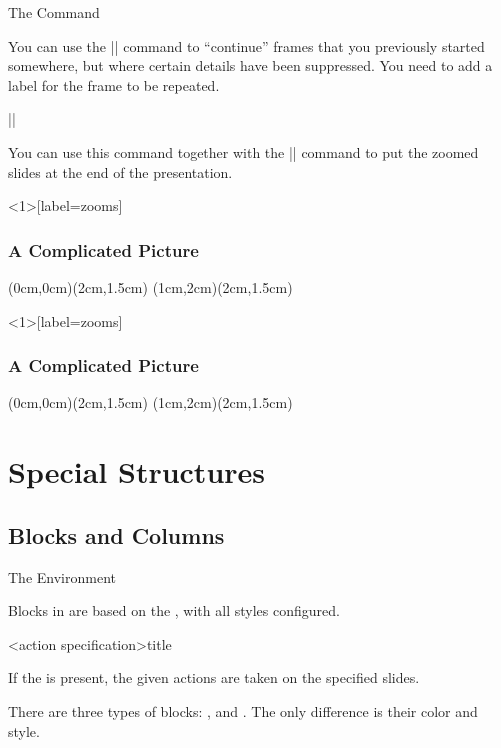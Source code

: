 \begin{fragileframe}{The  Command}
	
You can use the \LC|\againframe| command to ``continue'' frames that you previously started
somewhere, but where certain details have been suppressed. You need to add a label for the frame to be repeated.

\begin{command}
\LC||
\end{command}

You can use this command together with the \LC|\framezoom| command to put the zoomed slides at the end of the presentation.

\begin{example}
\begin{LCL}
\begin{frame}<1>[label=zooms]
\frametitle<1>{A Complicated Picture}
(0cm,0cm)(2cm,1.5cm)
(1cm,2cm)(2cm,1.5cm)
\end{frame}
\end{LCL}
\end{example}

\end{fragileframe}


\begin{frame}<1>[label=zooms]
\frametitle<1>{A Complicated Picture}
(0cm,0cm)(2cm,1.5cm)
(1cm,2cm)(2cm,1.5cm)
\end{frame}

\section{Special Structures}

\subsection{Blocks and Columns}

\begin{fragileframe}{The  Environment}

Blocks in  are based on the , with all styles configured.

\begin{command}
\begin{LCL}
\begin{block}<action specification>{title}
\end{block}
\end{LCL}
\end{command}

If the  is present, the given actions are taken on the specified slides. \medskip

There are three types of blocks: ,  and . The only difference is their color and style.

\end{fragileframe}


